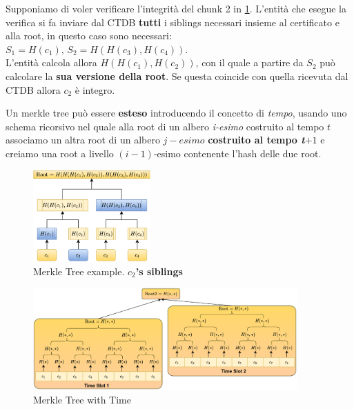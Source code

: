 \begin{example}
Supponiamo di voler verificare l'integrità del chunk 2 in \cref{fig:merkletree}. L'entità che esegue la verifica si fa inviare dal CTDB \textbf{tutti} i siblings necessari insieme al certificato e alla root, in questo caso sono necessari: $S_1=H(c_1),\,S_2=H(H(c_3),H(c_4))$.\\
L'entità calcola allora $H(H(c_1),H(c_2))$, con il quale a partire da $S_2$ può calcolare la \textbf{sua versione della root}. Se questa coincide con quella ricevuta dal CTDB allora $c_2$ è integro.
\end{example}
\begin{definition}
Un merkle tree può essere \textbf{esteso} introducendo il concetto di \textit{tempo}, usando uno schema ricorsivo nel quale alla root di un albero \textit{i-esimo} costruito al tempo $t$ associamo un altra root di un albero $j-esimo$ \textbf{costruito al tempo \textit{t$+1$}} e creiamo una root a livello $(i-1)$-esimo contenente l'hash delle due root.
\end{definition}
\begin{figure}[ht]
    \centering
    \includegraphics[width=0.4\textwidth]{image/merkletree.png}
    \caption{Merkle Tree example. \textbf{\textcolor{myColor1}{$c_2$'s siblings}}}
    \label{fig:merkletree}
\end{figure}
\begin{figure}[ht]
    \centering
    \includegraphics[width=0.9\textwidth]{image/merkletime.png}
    \caption{Merkle Tree with Time}
    \label{fig:merkletime}
\end{figure}
